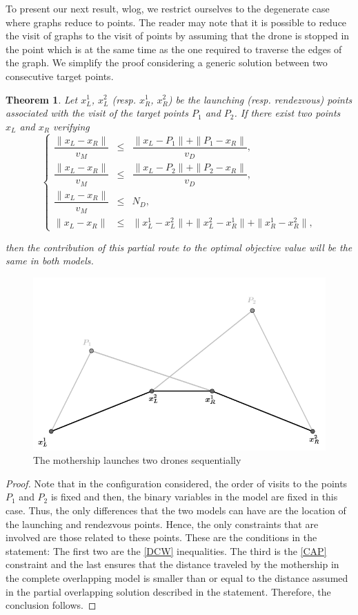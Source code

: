 \documentclass[10pt,a4paper]{elsarticle}
\newtheorem{theorem}{Theorem}[section]
\newcommand{\EN}[1]{{\color{black}#1}}
\begin{document}
\noindent
To present our next result, wlog, we restrict ourselves to the degenerate case where graphs reduce to points. The reader may note that it is possible to reduce the visit of graphs to the visit of points by assuming that the drone is stopped in the point which is at \EN{the} same time \EN{as} the one required to traverse the edges of the graph. We simplify the proof considering a generic solution between two consecutive target points.


\begin{theorem}\label{thm:relationship}
Let $x_L^1$, $x_L^2$ (resp. $x_R^1$, $x_R^2$) be the launching (resp. rendezvous) points associated with the visit of the target points $P_1$ and $P_2$. If there exist two points $x_L$ and $x_R$ verifying 
$$
\left\{
\begin{array}{ccl}
\dfrac{\|x_L-x_R\|}{v_M} & \leq    & \dfrac{\|x_L - P_1\| + \|P_1 - x_R\|}{v_D}, \\
\dfrac{\|x_L-x_R\|}{v_M} & \leq    & \dfrac{\|x_L - P_2\| + \|P_2 - x_R\|}{v_D}, \\
\dfrac{\|x_L-x_R\|}{v_M} & \leq   & N_D, \\
\|x_L-x_R\| & \leq & \|x_L^1 - x_L^2\| + \|x_L^2- x_R^1\| + \|x_R^1-x_R^2\|,
\end{array}
\right.
$$

\noindent then the contribution of this partial route to the optimal objective value will be the same in both models.
\end{theorem}
\begin{figure}[h!]
\centering
\includegraphics[width = 0.5\linewidth]{proof1_gray.PNG}
\caption{The mothership launches two drones sequentially}
\label{fig:proof1}
\end{figure}


\begin{proof}
Note that in the \EN{configuration considered}, the order of visits to the points $P_1$ and $P_2$ is fixed and then, the binary variables in the model are fixed in this case. Thus, the only differences that the two models can have are the location of the launching and rendezvous points. Hence, the only constraints that are involved are those related to these points. These are the conditions in the statement: The first two are the \eqref{DCW} inequalities. The third is the \eqref{CAP} constraint and the last ensures that the distance traveled by the mothership in the complete overlapping model is smaller than or equal to the distance assumed in the partial overlapping solution described in the statement. Therefore, the conclusion follows.
\end{proof}
\end{document}
